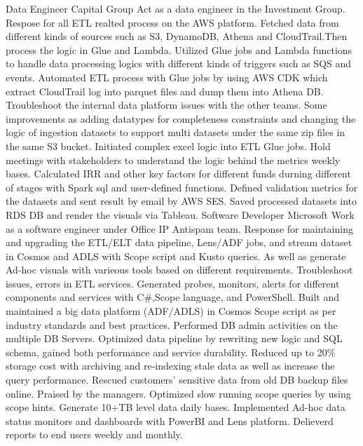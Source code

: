 \documentclass[a4paper]{ReadableCV}
\begin{document}
{}
        {Data Engineer}
        {Capital Group}
        {Act as a data engineer in the Investment Group. Respose for all ETL realted process on the AWS platform. Fetched data from different kinds of sources such as S3, DynamoDB, Athena and CloudTrail.Then process the logic in Glue and Lambda.}
{Utilized Glue jobs and Lambda functions to handle data processing logics with different kinds of triggers such as SQS and events.}
{Automated ETL process with Glue jobs by using AWS CDK which extract CloudTrail log into parquet files and dump them into Athena DB.}
{Troubleshoot the internal data platform issues with the other teams. Some improvements as adding datatypes for completeness constraints and changing the logic of ingestion datasets to support multi datasets under the same zip files in the same S3 bucket.}
{Initiated complex excel logic into ETL Glue jobs. Hold meetings with stakeholders to understand the logic behind the metrics weekly bases. Calculated IRR and other key factors for different funds durning different of stages with Spark sql and user-defined functions.}
{Defined validation metrics for the datasets and sent result by email by AWS SES. Saved processed datasets into RDS DB and render the visuals via Tableau.}
        {Software Developer}
        {Microsoft}
        {Work as a software engineer under Office IP Antispam team. Response for maintaining and upgrading the ETL/ELT data pipeline, Lens/ADF jobs, and stream dataset in 
		 Cosmos and ADLS with Scope script and Kusto queries. As well as generate Ad-hoc visuals with varieous tools based on different requirements. }
{Troubleshoot issues, errors in ETL services. Generated probes, monitors, alerts for different components and services with C\#,Scope language, and PowerShell.}
{Built and maintained a big data platform (ADF/ADLS) in Cosmos Scope script as per industry standards and best practices.}
{Performed DB admin activities on the multiple DB Servers. Optimized data pipeline by rewriting new logic and SQL schema, gained both performance and service 
durability. Reduced up to 20\% storage cost with archiving and re-indexing stale data as well as increase the query performance.}
{Rescued customers' sensitive data from old DB backup files online. Praised by the managers.}
{Optimized slow running scope queries by using scope hints. Generate 10+TB level data daily bases.}
{Implemented Ad-hoc data status monitors and dashboards with PowerBI and Lens platform. Delieverd reports to end users weekly and monthly.}
\end{document}
